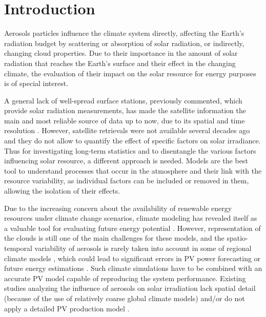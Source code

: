 
\section{Introduction}



Aerosols particles influence the climate system directly, affecting the Earth’s radiation budget by scattering or absorption of solar radiation, or indirectly, changing cloud properties. Due to their importance in the amount of solar radiation that reaches the Earth’s surface and their effect in the changing climate, the evaluation of their impact on the solar resource for energy purposes is of special interest.

A general lack of well-spread surface stations, previously commented, which provide solar radiation measurements, has made the satellite information the main and most reliable source of data up to now, due to its spatial and time resolution \cite*{Posselt2012, Ineichen2014}. However, satellite retrievals were not available several decades ago and they do not allow to quantify the effect of specific factors on solar irradiance. Thus for investigating long-term statistics and to disentangle the various factors influencing solar resource, a different approach is needed. Models are the best tool to understand processes that occur in the atmosphere and their link with the resource variability, as individual factors can be included or removed in them, allowing the isolation of their effects.

Due to the increasing concern about the availability of renewable energy resources under climate change scenarios, climate modeling has revealed itself as a valuable tool for evaluating future energy potential \cite*{Crook2011, Gaetani2014, Gaetani2015, Jerez2015, Jerez2015climix, Tobin2016}. However, representation of the clouds is still one of the main challenges for these models, and the spatio-temporal variability of aerosols is rarely taken into account in some of regional climate models \cite*{Bartok2017}, which could lead to significant errors in PV power forecasting or future energy estimations \cite*{Rieger2017}. Such climate simulations have to be combined with an accurate PV model capable of reproducing the system performance. Existing studies analyzing the influence of aerosols on solar irradiation lack spatial detail (because of the use of relatively coarse global climate models) and/or do not apply a detailed PV production model \cite*{Bergin2017}. 


